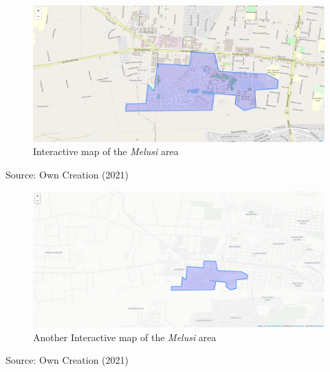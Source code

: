 \begin{figure}[H]
\centering
\includegraphics[scale=0.30,angle=90]{Figures/Chapter3/Folium}
\caption{Interactive map of the \textit{Melusi} area}
\label{fig:fol}
\end{figure}
\begin{center}
Source: Own Creation (2021)
\end{center}
\pagebreak
\begin{figure}[H]
\centering
\includegraphics[scale=0.5,angle=90]{Figures/Chapter3/Folium2}
\caption{Another Interactive map of the \textit{Melusi} area}
\label{fig:fol2}
\end{figure}
\begin{center}
Source: Own Creation (2021)
\end{center}